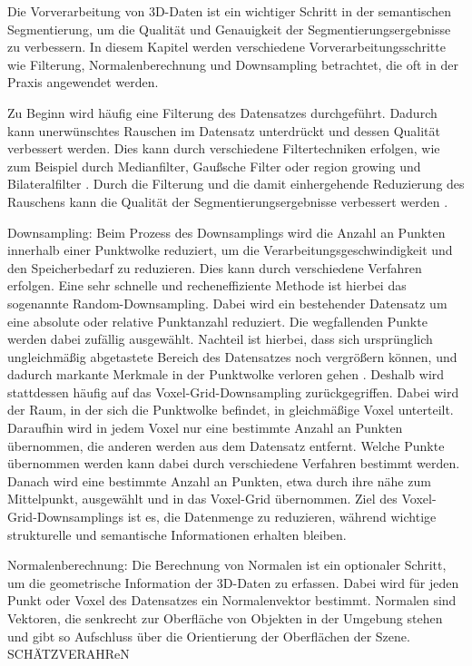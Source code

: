 Die Vorverarbeitung von 3D-Daten ist ein wichtiger Schritt in der semantischen
Segmentierung, um die Qualität und Genauigkeit der Segmentierungsergebnisse zu
verbessern. In diesem Kapitel werden verschiedene Vorverarbeitungsschritte wie
Filterung, Normalenberechnung und Downsampling betrachtet, die oft in der
Praxis angewendet werden.

Zu Beginn wird häufig eine Filterung des Datensatzes durchgeführt. Dadurch kann
unerwünschtes Rauschen im Datensatz unterdrückt und dessen Qualität verbessert
werden. Dies kann durch verschiedene Filtertechniken erfolgen, wie zum Beispiel
durch Medianfilter, Gaußsche Filter \cite{9191237} oder region growing und
Bilateralfilter \cite{6460813}. Durch die Filterung und die damit einhergehende
Reduzierung des Rauschens kann die Qualität der Segmentierungsergebnisse
verbessert werden \cite{HAN2017103}.

Downsampling: Beim Prozess des Downsamplings wird die Anzahl an Punkten
innerhalb einer Punktwolke reduziert, um die Verarbeitungsgeschwindigkeit und
den Speicherbedarf zu reduzieren. Dies kann durch verschiedene Verfahren
erfolgen. Eine sehr schnelle und recheneffiziente Methode ist hierbei das
sogenannte Random-Downsampling. Dabei wird ein bestehender Datensatz um eine
absolute oder relative Punktanzahl reduziert. Die wegfallenden Punkte werden
dabei zufällig ausgewählt. Nachteil ist hierbei, dass sich ursprünglich
ungleichmäßig abgetastete Bereich des Datensatzes noch vergrößern können, und
dadurch markante Merkmale in der Punktwolke verloren gehen \cite{987567547}.
Deshalb wird stattdessen häufig auf das Voxel-Grid-Downsampling
zurückgegriffen. Dabei wird der Raum, in der sich die Punktwolke befindet, in
gleichmäßige Voxel unterteilt. Daraufhin wird in jedem Voxel nur eine bestimmte
Anzahl an Punkten übernommen, die anderen werden aus dem Datensatz entfernt.
Welche Punkte übernommen werden kann dabei durch verschiedene Verfahren
bestimmt werden. Danach wird eine bestimmte Anzahl an Punkten, etwa durch ihre
nähe zum Mittelpunkt, ausgewählt und in das Voxel-Grid übernommen. Ziel des
Voxel-Grid-Downsamplings ist es, die Datenmenge zu reduzieren, während wichtige
strukturelle und semantische Informationen erhalten bleiben.

Normalenberechnung: Die Berechnung von Normalen ist ein optionaler Schritt, um
die geometrische Information der 3D-Daten zu erfassen. Dabei wird für jeden
Punkt oder Voxel des Datensatzes ein Normalenvektor bestimmt. Normalen sind
Vektoren, die senkrecht zur Oberfläche von Objekten in der Umgebung stehen und
gibt so Aufschluss über die Orientierung der Oberflächen der Szene.
SCHÄTZVERAHReN

